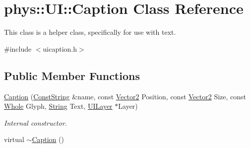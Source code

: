 \hypertarget{classphys_1_1UI_1_1Caption}{
\section{phys::UI::Caption Class Reference}
\label{d4/dfe/classphys_1_1UI_1_1Caption}
}


This class is a helper class, specifically for use with text.  




{\ttfamily \#include $<$uicaption.h$>$}

\subsection*{Public Member Functions}
\begin{DoxyCompactItemize}
\item 
\hyperlink{classphys_1_1UI_1_1Caption_a8e643db77a6f9b18147cf01cf3bd9238}{Caption} (\hyperlink{namespacephys_a5ce5049f8b4bf88d6413c47b504ebb31}{ConstString} \&name, const \hyperlink{classphys_1_1Vector2}{Vector2} Position, const \hyperlink{classphys_1_1Vector2}{Vector2} Size, const \hyperlink{namespacephys_a460f6bc24c8dd347b05e0366ae34f34a}{Whole} Glyph, \hyperlink{namespacephys_aa03900411993de7fbfec4789bc1d392e}{String} Text, \hyperlink{classphys_1_1UILayer}{UILayer} $\ast$Layer)
\begin{DoxyCompactList}\small\item\em Internal constructor. \item\end{DoxyCompactList}\item 
\hypertarget{classphys_1_1UI_1_1Caption_a5443ce0c7c7dc4b4f1c56b124e092a98}{
virtual \hyperlink{classphys_1_1UI_1_1Caption_a5443ce0c7c7dc4b4f1c56b124e092a98}{$\sim$Caption} ()}
\label{d4/dfe/classphys_1_1UI_1_1Caption_a5443ce0c7c7dc4b4f1c56b124e092a98}


\end{DoxyCompactItemize}
